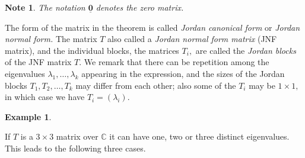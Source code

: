 \documentclass[12pt, a4paper]{article}
\newcommand{\bb}[1]{\mathbb{#1}}
\newcommand{\mb}[1]{\mathbf{#1}}
\newtheorem*{note}{Note}
\theoremstyle{definition}
\newtheorem*{example}{Example}
\theoremstyle{plain}
\begin{document}
\begin{note}
The notation $\underline{\mb{0}}$ denotes the zero matrix.
\end{note}

The form of the matrix in the theorem is called \textit{Jordan canonical form} or \textit{Jordan normal form.} The matrix $T$ also called a \textit{Jordan normal form matrix} (JNF matrix), and the individual blocks, the matrices $T_i,$ are called the \textit{Jordan blocks} of the JNF matrix $T.$ We remark that there can be repetition among the eigenvalues $\lambda_1,\ldots, \lambda_k$ appearing in the expression, and the sizes of the Jordan blocks $T_1,T_2,\ldots,T_k$ may differ from each other; also some of the $T_i$ may be $1\times1,$ in which case we have $T_i = (\lambda_i).$

\begin{example}

\end{example}
If $T$ is a $3 \times 3$ matrix over $\bb{C}$ it can have one, two or three distinct eigenvalues. This leads to the following three cases.
\end{document}

